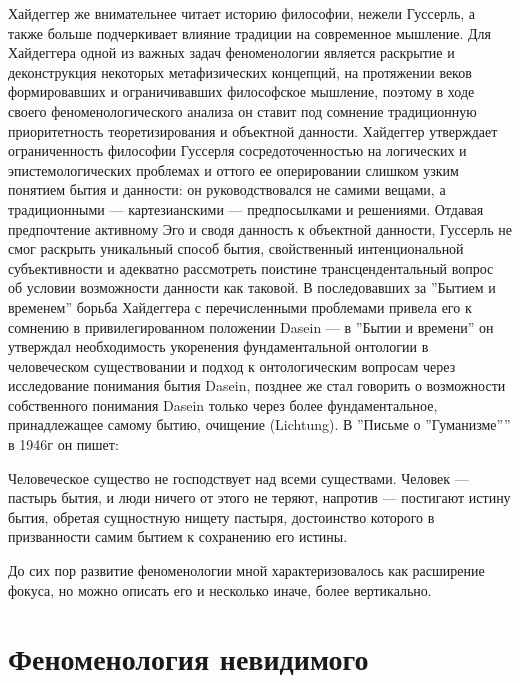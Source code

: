 \documentclass[11pt]{book}
\begin{document}
Хайдеггер же внимательнее читает историю философии, нежели Гуссерль, а также больше подчеркивает влияние традиции на современное мышление. Для Хайдеггера одной из важных задач феноменологии является раскрытие и деконструкция некоторых метафизических концепций, на протяжении веков формировавших и ограничивавших философское мышление, поэтому в ходе своего феноменологического анализа он ставит под сомнение традиционную приоритетность теоретизирования и объектной данности. Хайдеггер утверждает ограниченность философии Гуссерля сосредоточенностью на логических и эпистемологических проблемах и оттого ее оперировании слишком узким понятием бытия и данности: он руководствовался не самими вещами, а традиционными --- картезианскими --- предпосылками и решениями. Отдавая предпочтение активному Эго и сводя данность к объектной данности, Гуссерль не смог раскрыть уникальный способ бытия, свойственный интенциональной субъективности и адекватно рассмотреть поистине трансцендентальный вопрос об условии возможности данности как таковой. В последовавших за ''Бытием и временем'' борьба Хайдеггера с перечисленными проблемами привела его к сомнению в привилегированном положении Dasein --- в ''Бытии и времени'' он утверждал необходимость укоренения фундаментальной онтологии в человеческом существовании и подход к онтологическим вопросам через исследование понимания бытия Dasein, позднее же стал говорить о возможности собственного понимания Dasein только через более фундаментальное, принадлежащее самому бытию, очищение (Lichtung). В ''Письме о ''Гуманизме'''' в 1946г он пишет:

\smallskip
{}\relax
{}\relax

Человеческое существо не господствует над всеми существами. Человек --- пастырь бытия, и люди ничего от этого не теряют, напротив --- постигают истину бытия, обретая сущностную нищету пастыря, достоинство которого в призванности самим бытием к сохранению его истины.

\relax
{}\relax
\smallskip

До сих пор развитие феноменологии мной характеризовалось как расширение фокуса, но можно описать его и несколько иначе, более вертикально.

\section{Феноменология невидимого}
\end{document}
